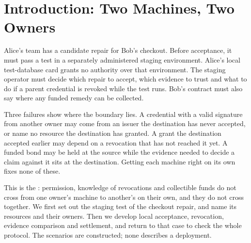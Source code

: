 \documentclass[11pt,a4paper]{article}
\theoremstyle{definition}
\theoremstyle{remark}
\begin{document}
\section{Introduction: Two Machines, Two Owners}\label{sec:fh-intro}
Alice's team has a candidate repair for Bob's checkout. Before acceptance,
it must pass a test in a separately administered staging environment.
Alice's local test-database card grants no authority over that environment.
The staging operator must decide which repair to accept, which evidence to
trust and what to do if a parent credential is revoked while the test runs.
Bob's contract must also say where any funded remedy can be collected.

Three failures show where the boundary lies. A credential with a valid
signature from another owner may come from an issuer the destination has never
accepted, or name no resource the destination has granted. A grant the
destination accepted earlier may depend on a revocation that has not reached it
yet. A funded bond may be held at the source while the evidence needed to decide
a claim against it sits at the destination. Getting each machine right on its
own fixes none of these.

This is the : permission, knowledge of revocations
and collectible funds do not cross from one owner's machine to another's on
their own, and they do not cross together. We first set out the staging test
of the checkout repair, and name its resources and their owners. Then we develop local acceptance, revocation,
evidence comparison and settlement, and return to that case to check the whole
protocol. The scenarios are constructed; none describes a deployment.
\end{document}
